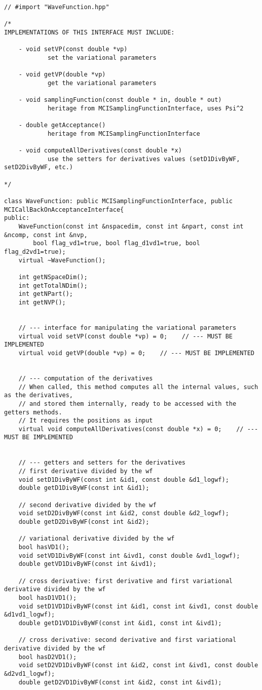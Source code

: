 \documentclass[11pt,a4paper,twoside]{article}
\begin{document}
\begin{lstlisting}
// #import "WaveFunction.hpp"

/*
IMPLEMENTATIONS OF THIS INTERFACE MUST INCLUDE:

    - void setVP(const double *vp)
            set the variational parameters

    - void getVP(double *vp)
            get the variational parameters

    - void samplingFunction(const double * in, double * out)
            heritage from MCISamplingFunctionInterface, uses Psi^2

    - double getAcceptance()
            heritage from MCISamplingFunctionInterface

    - void computeAllDerivatives(const double *x)
            use the setters for derivatives values (setD1DivByWF, setD2DivByWF, etc.)

*/

class WaveFunction: public MCISamplingFunctionInterface, public MCICallBackOnAcceptanceInterface{
public:
    WaveFunction(const int &nspacedim, const int &npart, const int &ncomp, const int &nvp,
        bool flag_vd1=true, bool flag_d1vd1=true, bool flag_d2vd1=true);
    virtual ~WaveFunction();

    int getNSpaceDim();
    int getTotalNDim();
    int getNPart();
    int getNVP();


    // --- interface for manipulating the variational parameters
    virtual void setVP(const double *vp) = 0;    // --- MUST BE IMPLEMENTED
    virtual void getVP(double *vp) = 0;    // --- MUST BE IMPLEMENTED


    // --- computation of the derivatives
    // When called, this method computes all the internal values, such as the derivatives,
    // and stored them internally, ready to be accessed with the getters methods.
    // It requires the positions as input
    virtual void computeAllDerivatives(const double *x) = 0;    // --- MUST BE IMPLEMENTED


    // --- getters and setters for the derivatives
    // first derivative divided by the wf
    void setD1DivByWF(const int &id1, const double &d1_logwf);
    double getD1DivByWF(const int &id1);

    // second derivative divided by the wf
    void setD2DivByWF(const int &id2, const double &d2_logwf);
    double getD2DivByWF(const int &id2);

    // variational derivative divided by the wf
    bool hasVD1();
    void setVD1DivByWF(const int &ivd1, const double &vd1_logwf);
    double getVD1DivByWF(const int &ivd1);

    // cross derivative: first derivative and first variational derivative divided by the wf
    bool hasD1VD1();
    void setD1VD1DivByWF(const int &id1, const int &ivd1, const double &d1vd1_logwf);
    double getD1VD1DivByWF(const int &id1, const int &ivd1);

    // cross derivative: second derivative and first variational derivative divided by the wf
    bool hasD2VD1();
    void setD2VD1DivByWF(const int &id2, const int &ivd1, const double &d2vd1_logwf);
    double getD2VD1DivByWF(const int &id2, const int &ivd1);
\end{lstlisting}
\end{document}
